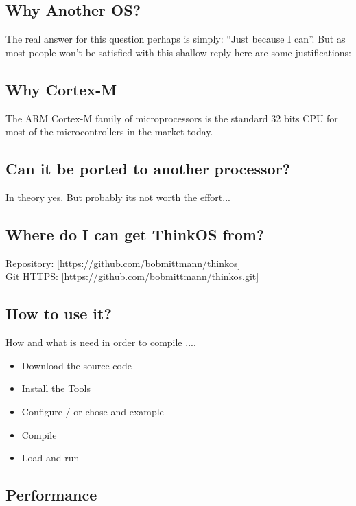 \subsection{Why Another OS?}

The real answer for this question perhaps is simply: ``Just because I can''. But as most people won't be satisfied with this shallow reply here are some justifications:

\subsection{Why Cortex-M}

The ARM Cortex-M family of microprocessors is the standard 32 bits CPU for most of the microcontrollers in the market today.

\subsection{Can it be ported to another processor?}

In theory yes. But probably its not worth the effort...


\subsection{Where do I can get ThinkOS from?}

\begin{flushleft}
Repository: [\href{https://github.com/bobmittmann/thinkos}{https://github.com/bobmittmann/thinkos}]\\
Git HTTPS: [\href{https://github.com/bobmittmann/thinkos.git}{https://github.com/bobmittmann/thinkos.git}]
\end{flushleft}

\subsection{How to use it?}
 How and what is need in order to compile \ThinkOS ....
\begin{itemize}
\item Download the source code
\item Install the Tools
\item Configure / or chose and example
\item Compile
\item Load and run
\end{itemize}


\subsection{Performance}

